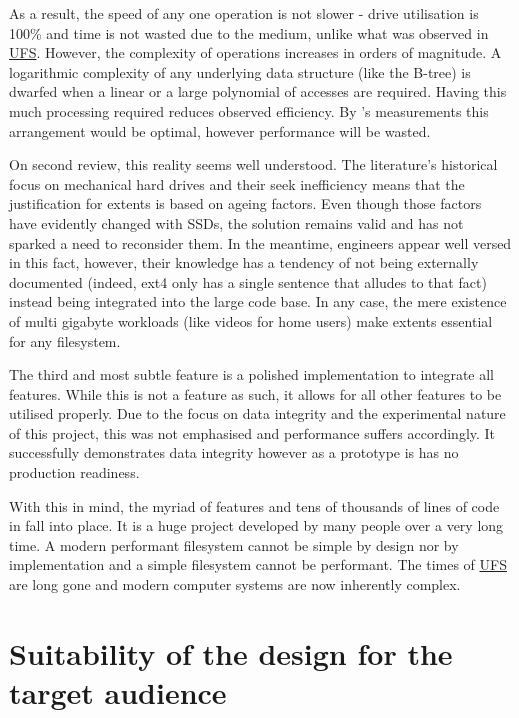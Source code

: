        As a result, the speed of any one operation is not slower - drive
        utilisation is 100\% and time is not wasted due to the medium,
        unlike what was observed in \hyperref[sec:UFS]{UFS}. However,
        the complexity of operations increases in orders of magnitude. A
        logarithmic complexity of any underlying data structure (like the
        B-tree) is dwarfed when a linear or a large polynomial of accesses are
        required. Having this much processing required reduces observed
        efficiency. By 's measurements this arrangement would
        be optimal, however performance will be wasted.

        On second review, this reality seems well understood. The literature's
        historical focus on mechanical hard drives and their seek inefficiency
        means that the justification for extents is based on ageing factors.
        Even though those factors have evidently changed with SSDs, the
        solution remains valid and has not sparked a need to reconsider them.
        In the meantime, engineers appear well versed in this fact, however,
        their knowledge has a tendency of not being externally documented
        (indeed, ext4 only has a single sentence that alludes to that fact) instead
        being integrated into the large code base. In any case, the mere
        existence of multi gigabyte workloads (like videos for home users) make
        extents essential for any filesystem.

        The third and most subtle feature is a polished implementation to
        integrate all features. While this is not a feature as such, it allows
        for all other features to be utilised properly. Due to the focus on
        data integrity and the experimental nature of this project, this was
        not emphasised and performance suffers accordingly. It
        successfully demonstrates data integrity however as a prototype is has
        no production readiness.

        With this in mind, the myriad of features and tens of thousands of
        lines of code in  fall into place. It is a huge
        project developed by many people over a very long time. A modern
        performant filesystem cannot be simple by design nor by implementation
        and a simple filesystem cannot be performant. The times of
        \hyperref[sec:UFS]{UFS} are long gone and modern computer systems are
        now inherently complex.

    \section{Suitability of the design for the target audience}

